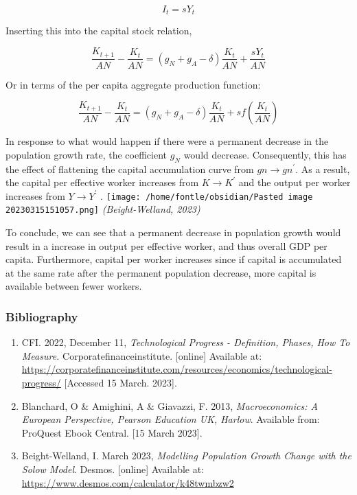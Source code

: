 \documentclass[
]{article}
\providecommand{\tightlist}{%
  \setlength{\itemsep}{0pt}\setlength{\parskip}{0pt}}
\begin{document}
{\[I_{t} = sY_{t}\]}

Inserting this into the capital stock relation,

{\[\frac{K_{t + 1}}{AN} - \frac{K_{t}}{AN} = (g_{N} + g_{A} - \delta)\frac{K_{t}}{AN} + \frac{sY_{t}}{AN}\]}

Or in terms of the per capita aggregate production function:

{\[\frac{K_{t + 1}}{AN} - \frac{K_{t}}{AN} = (g_{N} + g_{A} - \delta)\frac{K_{t}}{AN} + sf\left( \frac{K_{t}}{AN} \right)\]}

In response to what would happen if there were a permanent decrease in
the population growth rate, the coefficient {\(g_{N}\)} would decrease.
Consequently, this has the effect of flattening the capital accumulation
curve from {\(gn \rightarrow gn^{\prime}\)}. As a result, the capital
per effective worker increases from {\(K \rightarrow K^{\prime}\)} and
the output per worker increases from {\(Y \rightarrow Y^{\prime}\)} .
\texttt{[image: /home/fontle/obsidian/Pasted image 20230315151057.png]}
\emph{(Beight-Welland, 2023)}

To conclude, we can see that a permanent decrease in population growth
would result in a increase in output per effective worker, and thus
overall GDP per capita. Furthermore, capital per worker increases since
if capital is accumulated at the same rate after the permanent
population decrease, more capital is available between fewer workers.

\hypertarget{bibliography}{%
\subsubsection{Bibliography}\label{bibliography}}

\begin{enumerate}
\tightlist
\item
  CFI. 2022, December 11, \emph{Technological Progress - Definition,
  Phases, How To Measure.} Corporatefinanceinstitute. {[}online{]}
  Available at:
  \url{https://corporatefinanceinstitute.com/resources/economics/technological-progress/}
  {[}Accessed 15 March. 2023{]}.
\item
  Blanchard, O \& Amighini, A \& Giavazzi, F. 2013,
  \emph{Macroeconomics: A European Perspective, Pearson Education UK,
  Harlow}. Available from: ProQuest Ebook Central. {[}15 March 2023{]}.
\item
  Beight-Welland, I. March 2023, \emph{Modelling Population Growth
  Change with the Solow Model}. Desmos. {[}online{]} Available at:
  \url{https://www.desmos.com/calculator/k48twmbzw2}
\end{enumerate}
\end{document}
